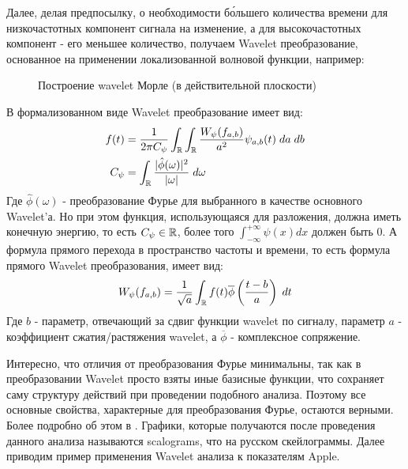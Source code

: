 Далее, делая предпосылку, о необходимости б\'{о}льшего количества времени для низкочастотных компонент сигнала на изменение, а для высокочастотных компонент - его меньшее количество, получаем Wavelet преобразование, основанное на применении локализованной волновой функции, например:
\begin{figure}[H]
	\centering
	\caption{Построение wavelet Морле (в действительной плоскости)}
\end{figure}
\noindent В формализованном виде Wavelet преобразование имеет вид:
\begin{equation}
	\begin{split}
		f(t) & = \frac{1}{2\pi C_{\psi}} \int_{\mathbb{R}} \int_{\mathbb{R}} \frac{W_{\psi}(f_{a, b})}{a^2}\psi_{a, b}(t) \; da \; db\\
		C_{\psi} & = \int_{\mathbb{R}} \frac{|\hat{\phi}(\omega)|^2}{|\omega|} \; d \omega
	\end{split}
\end{equation}
Где $\hat{\phi}(\omega)$ - преобразование Фурье для выбранного в качестве основного Wavelet'а. Но при этом функция, использующаяся для разложения, должна иметь конечную энергию, то есть $C_{\psi} \in \mathbb{R}$, более того $\int_{-\infty}^{+\infty} \psi(x) dx$ должен быть $0$. А формула прямого перехода в пространство частоты и времени, то есть формула прямого Wavelet преобразования, имеет вид:
\begin{equation}
	W_{\psi}(f_{a, b}) = \frac{1}{\sqrt{a}}\int_{\mathbb{R}}f(t) \overline{\phi}\left( \frac{t - b}{a} \right) \; dt
\end{equation}
Где $b$ - параметр, отвечающий за сдвиг функции wavelet по сигналу, параметр $a$ - коэффициент сжатия/растяжения wavelet, а $\overline{\phi}$ - комплексное сопряжение.

Интересно, что отличия от преобразования Фурье минимальны, так как в преобразовании Wavelet просто взяты иные базисные функции, что сохраняет саму структуру действий при проведении подобного анализа. Поэтому все основные свойства, характерные для преобразования Фурье, остаются верными. Более подробно об этом в \cite{brunton2022data}. Графики, которые получаются после проведения данного анализа называются scalograms, что на русском скейлограммы. Далее приводим пример применения Wavelet анализа к показателям Apple.


